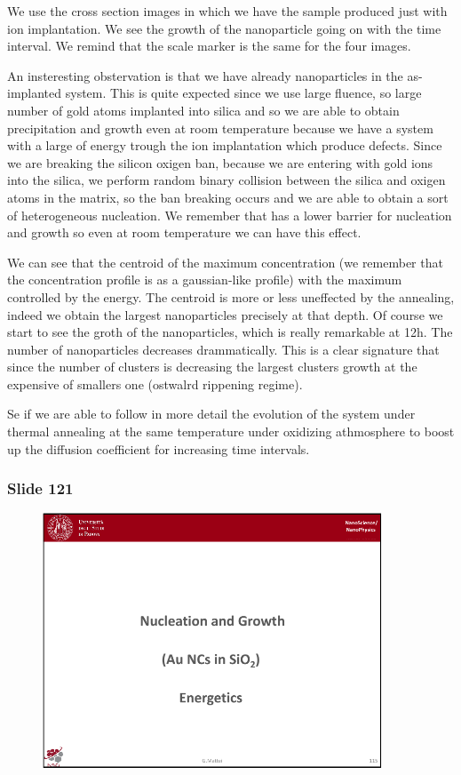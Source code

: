 \documentclass[../main/main.tex]{subfiles}
\begin{document}
We use the cross section images in which we have the sample produced just with ion implantation. We see the growth of the nanoparticle going on with the time interval. We remind that the scale marker is the same for the four images.

An insteresting obstervation is that we have already nanoparticles in the as-implanted system. This is quite expected since we use large fluence, so large number of gold atoms implanted into silica and so we are able to obtain precipitation and growth even at room temperature because we have a system with a large of energy trough the ion implantation which produce defects. Since we are breaking the silicon oxigen ban, because we are entering with gold ions into the silica, we perform random binary collision between the silica and oxigen atoms in the matrix, so the ban breaking occurs and we are able to obtain a sort of heterogeneous nucleation. We remember that has a lower barrier for nucleation and growth so even at room temperature we can have this effect.

We can see that the centroid of the maximum concentration (we remember that the concentration profile is as a gaussian-like profile) with the maximum controlled by the energy. The centroid is more or less uneffected by the annealing, indeed we obtain the largest nanoparticles precisely at that depth. Of course we start to see the groth of the nanoparticles, which is really remarkable at 12h. The number of nanoparticles decreases drammatically. This is a clear signature that since the number of clusters is decreasing the largest clusters growth at the expensive of smallers one (ostwalrd rippening regime).

Se if we are able to follow in more detail the evolution of the system under thermal annealing  at the same temperature under oxidizing athmosphere to boost up the diffusion coefficient for increasing time intervals.

\newpage
\subsubsection{Slide 121}

\begin{figure}[h!]
\centering
\includegraphics[page=7,width=0.9\textwidth]{../lessons/pdf_file/8_lesson.pdf}
\end{figure}
\end{document}
